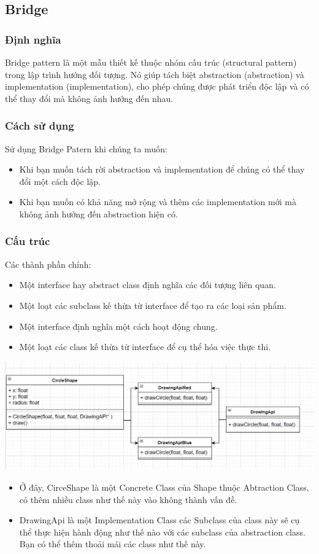 \subsection{Bridge}
\subsubsection{Định nghĩa}
Bridge pattern là một mẫu thiết kế thuộc nhóm cấu trúc (structural pattern) trong lập trình hướng đối tượng. Nó giúp tách biệt abstraction (abstraction) và implementation (implementation), cho phép chúng được phát triển độc lập và có thể thay đổi mà không ảnh hưởng đến nhau.
\subsubsection{Cách sử dụng}
Sử dụng Bridge Patern khi chúng ta muốn:
\begin{itemize}
    \item Khi bạn muốn tách rời abstraction và implementation để chúng có thể thay đổi một cách độc lập.
    \item Khi bạn muốn có khả năng mở rộng và thêm các implementation mới mà không ảnh hưởng đến abstraction hiện có.
\end{itemize}
\subsubsection{Cấu trúc}
Các thành phần chính:
\begin{itemize}
    \item Một interface hay abstract class định nghĩa các đối tượng liên quan.
    \item Một loạt các subclass kế thừa từ interface để tạo ra các loại sản phẩm.
    \item Một interface định nghĩa một cách hoạt động chung.
    \item Một loạt các class kế thừa từ interface để cụ thể hóa việc thực thi.
\end{itemize}
\begin{center}
    \includegraphics[scale=0.7]{image/structural/bridge.png}
\end{center}
\begin{itemize}
    \item Ở đây, CirceShape là một Concrete Class của Shape thuộc Abtraction Class, có thêm nhiều class như thế này vào không thành vấn đề.
    \item DrawingApi là một Implementation Class các Subclass của class này sẽ cụ thể thực hiện hành động như thế nào với các subclass của abstraction class. Bạn có thể thêm thoải mái các class như thế này.
\end{itemize}
